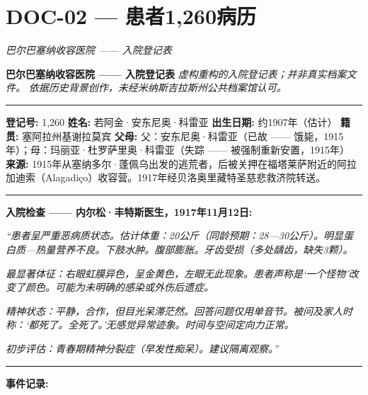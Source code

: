 \section*{\textbf{DOC-02} --- 患者1,260病历}

\noindent \textit{巴尔巴塞纳收容医院 —— 入院登记表}

\noindent \textbf{巴尔巴塞纳收容医院 —— 入院登记表}
\textit{虚构重构的入院登记表；并非真实档案文件。}
\textit{依据历史背景创作，未经米纳斯吉拉斯州公共档案馆认可。}

\vspace{0.5em}\noindent\rule{\textwidth}{0.5pt}\vspace{0.5em}

\noindent \textbf{登记号:} 1,260  
\textbf{姓名:} 若阿金·安东尼奥·科雷亚  
\textbf{出生日期:} 约1907年（估计）  
\textbf{籍贯:} 塞阿拉州基谢拉莫宾  
\textbf{父母:} 父：安东尼奥·科雷亚（已故 —— 饿毙，1915年）；母：玛丽亚·杜罗萨里奥·科雷亚（失踪 —— 被强制重新安置，1915年）  
\textbf{来源:} 1915年从塞纳多尔·蓬佩乌出发的逃荒者，后被关押在福塔莱萨附近的阿拉加迪索（Alagadiço）收容营。1917年经贝洛奥里藏特圣慈悲救济院转送。

\vspace{0.5em}\noindent\rule{\textwidth}{0.5pt}\vspace{0.5em}

\noindent \textbf{入院检查 —— 内尔松·丰特斯医生，1917年11月12日:}

\noindent \textit{“患者呈严重恶病质状态。估计体重：20公斤（同龄预期：28—30公斤）。明显蛋白质—热量营养不良。下肢水肿。腹部膨胀。牙齿受损（多处龋齿，缺失3颗）。}

\noindent \textit{最显著体征：右眼虹膜异色，呈金黄色，左眼无此现象。患者声称是‘一个怪物’改变了颜色。可能为未明确的感染或外伤后遗症。}

\noindent \textit{精神状态：平静，合作，但目光呆滞茫然。回答问题仅用单音节。被问及家人时称：‘都死了。全死了。’无感觉异常迹象。时间与空间定向力正常。}

\noindent \textit{初步评估：青春期精神分裂症（早发性痴呆）。建议隔离观察。”}

\vspace{0.5em}\noindent\rule{\textwidth}{0.5pt}\vspace{0.5em}

\noindent \textbf{事件记录:}

